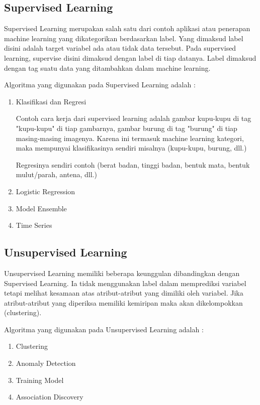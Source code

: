 \subsection{Supervised Learning}
\par
Supervised Learning merupakan salah satu dari contoh aplikasi atau penerapan machine learning yang dikategorikan berdasarkan label. Yang dimaksud label disini adalah target variabel ada atau tidak data tersebut. Pada supervised learning, supervise disini dimaksud dengan label di tiap datanya. Label dimaksud dengan tag suatu data yang ditambahkan dalam machine learning.
\par
Algoritma yang digunakan pada Supervised Learning adalah :
\begin{enumerate}
    \item Klasifikasi dan Regresi
    \par Contoh cara kerja dari supervised learning adalah gambar kupu-kupu di tag "kupu-kupu" di tiap gambarnya, gambar burung di tag "burung" di tiap masing-masing imagenya. Karena ini termasuk machine learning kategori, maka mempunyai klasifikasinya sendiri misalnya (kupu-kupu, burung, dll.)
    \par
    Regresinya sendiri contoh (berat badan, tinggi badan, bentuk mata, bentuk mulut/parah, antena, dll.)
    \item Logistic Regression
    \item Model Ensemble
    \item Time Series
\end{enumerate}
\subsection{Unsupervised Learning}
\par
Unsupervised Learning memiliki beberapa keunggulan dibandingkan dengan Supervised Learning. Ia tidak menggunakan label dalam memprediksi variabel tetapi melihat kesamaan atas atribut-atribut yang dimiliki oleh variabel. Jika atribut-atribut yang diperiksa memiliki kemiripan maka akan dikelompokkan (clustering).
\par
Algoritma yang digunakan pada Unsupervised Learning adalah :
\begin{enumerate}
    \item Clustering
    \item Anomaly Detection
    \item Training Model
    \item Association Discovery
\end{enumerate}

